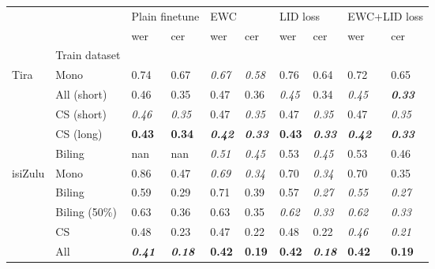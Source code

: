 \begin{tabular}{llllllllll}
\toprule
 &  & \multicolumn{2}{l}{Plain finetune} & \multicolumn{2}{l}{EWC} & \multicolumn{2}{l}{LID loss} & \multicolumn{2}{l}{EWC+LID loss} \\
 &  & wer & cer & wer & cer & wer & cer & wer & cer \\
 & Train dataset &  &  &  &  &  &  &  &  \\
\midrule
Tira & Mono & 0.74 & 0.67 & \textit{0.67} & \textit{0.58} & 0.76 & 0.64 & 0.72 & 0.65 \\
 & All (short) & 0.46 & 0.35 & 0.47 & 0.36 & \textit{0.45} & 0.34 & \textit{0.45} & \textit{\textbf{0.33}} \\
 & CS (short) & \textit{0.46} & \textit{0.35} & 0.47 & \textit{0.35} & 0.47 & \textit{0.35} & 0.47 & \textit{0.35} \\
 & CS (long) & \textbf{0.43} & \textbf{0.34} & \textit{\textbf{0.42}} & \textit{\textbf{0.33}} & \textbf{0.43} & \textit{\textbf{0.33}} & \textit{\textbf{0.42}} & \textit{\textbf{0.33}} \\
 & Biling & nan & nan & \textit{0.51} & \textit{0.45} & 0.53 & \textit{0.45} & 0.53 & 0.46 \\
\midrule
isiZulu & Mono & 0.86 & 0.47 & \textit{0.69} & \textit{0.34} & 0.70 & \textit{0.34} & 0.70 & 0.35 \\
 & Biling & 0.59 & 0.29 & 0.71 & 0.39 & 0.57 & \textit{0.27} & \textit{0.55} & \textit{0.27} \\
 & Biling (50\%) & 0.63 & 0.36 & 0.63 & 0.35 & \textit{0.62} & \textit{0.33} & \textit{0.62} & \textit{0.33} \\
 & CS & 0.48 & 0.23 & 0.47 & 0.22 & 0.48 & 0.22 & \textit{0.46} & \textit{0.21} \\
 & All & \textit{\textbf{0.41}} & \textit{\textbf{0.18}} & \textbf{0.42} & \textbf{0.19} & \textbf{0.42} & \textit{\textbf{0.18}} & \textbf{0.42} & \textbf{0.19} \\
\bottomrule
\end{tabular}
